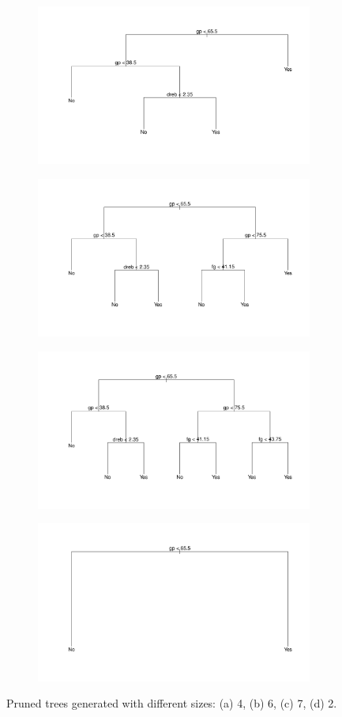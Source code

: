 \begin{figure}[h]
	\centering
	\begin{subfigure}{.5\textwidth}
		\centering
		\includegraphics[width=0.6\linewidth]{ImageFiles/Classification/Trees/tree_size_4.pdf}
		\caption{}
		\label{fig:tree_size_4}
	\end{subfigure}%
	\begin{subfigure}{.5\textwidth}
		\centering
		\includegraphics[width=0.6\linewidth]{ImageFiles/Classification/Trees/tree_size_6.pdf}
		\caption{}
		\label{fig:tree_size_6}
	\end{subfigure}
	\begin{subfigure}{.5\textwidth}
		\centering
		\includegraphics[width=0.6\linewidth]{ImageFiles/Classification/Trees/tree_size_7.pdf}
		\caption{}
		\label{fig:tree_size_7}
	\end{subfigure}%
	\begin{subfigure}{.5\textwidth}
		\centering
		\includegraphics[width=0.6\linewidth]{ImageFiles/Classification/Trees/tree_size_2.pdf}
		\caption{}
		\label{fig:tree_size_2}
	\end{subfigure}
	\caption{Pruned trees generated with different sizes: (a) 4, (b) 6, (c) 7, (d) 2.}
	\label{fig:trees_size}
\end{figure}

